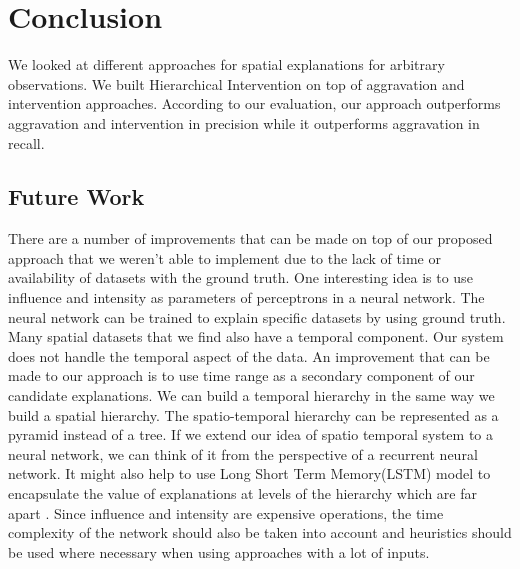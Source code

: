 \chapter{Conclusion}
\label{chp:concl}
We looked at different approaches for spatial explanations for arbitrary observations. We built Hierarchical Intervention on top of aggravation and intervention approaches. According to our evaluation, our approach outperforms aggravation and intervention in precision while it outperforms aggravation in recall.

\section{Future Work}
There are a number of improvements that can be made on top of our proposed approach that we weren't able to implement due to the lack of time or availability of datasets with the ground truth. One interesting idea is to use influence and intensity as parameters of perceptrons in a neural network\citep{grossberg1988nonlinear,widrow199030}. The neural network can be trained to explain specific datasets by using ground truth. 
Many spatial datasets that we find also have a temporal component. Our system does not handle the temporal aspect of the data. An improvement that can be made to our approach is to use time range as a secondary component of our candidate explanations. We can build a temporal hierarchy in the same way we build a spatial hierarchy. The spatio-temporal hierarchy can be represented as a pyramid instead of a tree.
If we extend our idea of spatio temporal system to a neural network, we can think of it from the perspective of a recurrent neural network\citep{chung2016hierarchical}. It might also help to use Long Short Term Memory(LSTM) model to encapsulate the value of explanations at levels of the hierarchy which are far apart \citep{hochreiter1997long}.
Since influence and intensity are expensive operations, the time complexity of the network should also be taken into account and heuristics should be used where necessary when using approaches with a lot of inputs.

